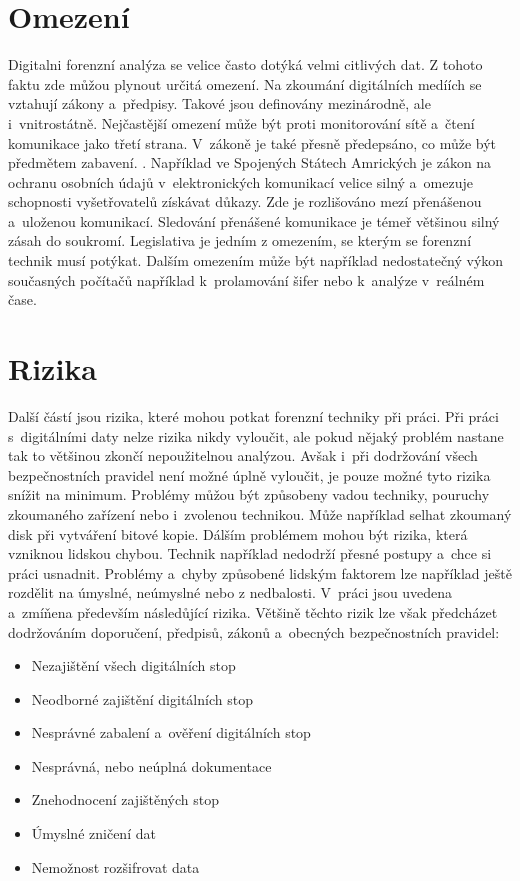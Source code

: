 \documentclass[thesis=B,czech]{FITthesis}[2012/06/26]
\begin{document}
\section{Omezení}

Digitalni forenzní analýza se velice často dotýká velmi citlivých dat. Z tohoto faktu zde můžou plynout určitá omezení. Na zkoumání  digitálních medíích se vztahují zákony a~předpisy. Takové jsou definovány mezinárodně, ale i~vnitrostátně. Nejčastější omezení může být proti monitorování sítě a~čtení komunikace jako třetí strana. V~zákoně je také přesně předepsáno, co může být předmětem zabavení. \cite{for_wi}. Například ve Spojených Státech Amrických je zákon na ochranu osobních údajů v~elektronických komunikací velice silný a~omezuje schopnosti vyšetřovatelů získávat důkazy. Zde je rozlišováno mezí přenášenou a~uloženou komunikací. Sledování přenášené komunikace je témeř většinou silný zásah do soukromí. Legislativa je jedním z omezením, se kterým se forenzní technik musí potýkat. Dalším omezením může být například nedostatečný výkon současných počítačů například k~prolamování šifer nebo k~analýze v~reálném čase. 


\section{Rizika}
Další částí jsou rizika, které mohou potkat forenzní techniky při práci. Při práci s~digitálními daty nelze rizika nikdy vyloučit, ale pokud nějaký problém nastane tak to většinou zkončí nepoužitelnou analýzou. Avšak i~při dodržování všech bezpečnostních pravidel není možné úplně vyloučit, je pouze možné tyto rizika snížit na minimum. Problémy můžou být způsobeny vadou techniky, pouruchy zkoumaného zařízení nebo i~zvolenou technikou. Může například selhat zkoumaný disk při vytváření bitové kopie. Dálším problémem mohou být rizika, která vzniknou lidskou chybou. Technik například nedodrží přesné postupy a~chce si práci usnadnit. Problémy a~chyby způsobené lidským faktorem lze například ještě rozdělit na úmyslné, neúmyslné nebo z nedbalosti. V~práci \cite{for_baka} jsou uvedena a~zmíňena především následůjící rizika. Většině těchto rizik lze však předcházet dodržováním doporučení, předpisů, zákonů a~obecných bezpečnostních pravidel:

\begin{itemize}
\item Nezajištění všech digitálních stop
\item Neodborné zajištění digitálních stop
\item Nesprávné zabalení a~ověření digitálních stop
\item Nesprávná, nebo neúplná dokumentace
\item Znehodnocení zajištěných stop
\item Úmyslné zničení dat
\item Nemožnost rozšifrovat data

\end{itemize}
\end{document}
